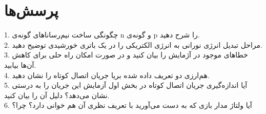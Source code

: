 \documentclass{article}
\begin{document}
\section{پرسش‌ها}
1. چگونگی ساخت نیم‌رسانا‌های گونه‌ی n و گونه‌ی p را شرح دهید.\\
2. مراحل تبدیل انرژی نورانی به انرژی الکتریکی را در یک باتری خورشیدی توضیح دهید.\\
3. خطاهای موجود در آژمایش را بیان کنید و در صورت امکان راه حلی برای کاهش آن‌ها بیابید.\\
4. هم‌ارزی دو تعریف داده شده بریا جریان اتصال کوتاه را نشان دهید.\\
5. آیا اندازه‌گیری جریان اتصال کوتاه در بخش اول آزمایش این جریان را به درستی نشان می‌دهد؟ دلیل آن را بیان کنید.\\
6. آیا ولتاژ مدار بازی که به دست می‌آورید با تعریف نظری آن هم خوانی دارد؟ چرا؟\\
	
	
	
	
	
	
	
	
	
\end{document}

